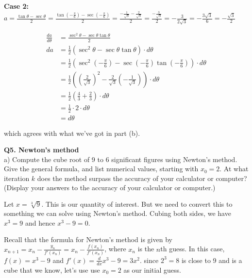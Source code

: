 \documentclass[9pt]{article}
\begin{document}
\textbf{Case 2:} $a = \frac{\tan \theta - \sec \theta}{2} = \frac{\tan (-\frac{\pi}{6}) - \sec (-\frac{\pi}{6})}{2} = \frac{-\frac{1}{\sqrt{3}} - \frac{2}{\sqrt{3}}}{2} = \frac{-\frac{3}{\sqrt{3}}}{2} = -\frac{3}{2 \sqrt{3}} = -\frac{3 \sqrt{3}}{6} = -\frac{\sqrt{3}}{2}$

\begin{align*}
  \frac{da}{d \theta} &= \frac{\sec^2 \theta - \sec \theta \tan \theta}{2} \\
  da &= \frac{1}{2} (\sec^2 \theta - \sec \theta \tan \theta) \cdot d \theta \\
     &= \frac{1}{2} (\sec^2 (-\frac{\pi}{6}) - \sec(-\frac{\pi}{6}) \tan(-\frac{\pi}{6})) \cdot d \theta \\
     &= \frac{1}{2} ((\frac{2}{\sqrt{3}})^2 - \frac{2}{\sqrt{3}}(-\frac{1}{\sqrt{3}})) \cdot d \theta \\
     &= \frac{1}{2} (\frac{4}{3} + \frac{2}{3}) \cdot d \theta \\
     &= \frac{1}{2} \cdot 2 \cdot d \theta \\
     &= d \theta
\end{align*}

which agrees with what we've got in part (b).

\begin{tcolorbox}
  \textbf{Q5. Newton's method} \\
  a) Compute the cube root of 9 to 6 significant figures using Newton's method. Give the general formula, and list numerical values, starting with $x_0 = 2$. At what iteration $k$ does the method surpass the accuracy of your calculator or computer? (Display your answers to the accuracy of your calculator or computer.)
\end{tcolorbox}

Let $x = \sqrt[3]{9}$. This is our quantity of interest. But we need to convert this to something we can solve using Newton's method. Cubing both sides, we have $x^3 = 9$ and hence $x^3 - 9 = 0$.

Recall that the formula for Newton's method is given by $x_{n+1} = x_n - \frac{y_n}{f'(x_n)} = x_n - \frac{f(x_n)}{f'(x_n)}$, where $x_n$ is the $n$th guess. In this case, $f(x) = x^3 - 9$ and $f'(x) = \frac{d}{dx} x^3 - 9 = 3x^2$. since $2^3 = 8$ is close to 9 and is a cube that we know, let's use use $x_0 = 2$ as our initial guess.
\end{document}
